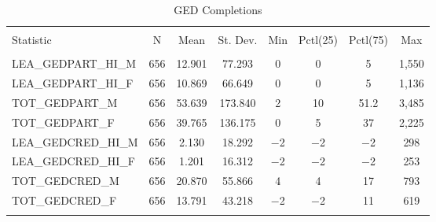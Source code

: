
\begin{table}[!htbp] \centering 
  \caption{GED Completions} 
  \label{} 
\begin{tabular}{@{\extracolsep{5pt}}lccccccc} 
\\[-1.8ex]\hline 
\hline \\[-1.8ex] 
Statistic & \multicolumn{1}{c}{N} & \multicolumn{1}{c}{Mean} & \multicolumn{1}{c}{St. Dev.} & \multicolumn{1}{c}{Min} & \multicolumn{1}{c}{Pctl(25)} & \multicolumn{1}{c}{Pctl(75)} & \multicolumn{1}{c}{Max} \\ 
\hline \\[-1.8ex] 
LEA\_GEDPART\_HI\_M & 656 & 12.901 & 77.293 & 0 & 0 & 5 & 1,550 \\ 
LEA\_GEDPART\_HI\_F & 656 & 10.869 & 66.649 & 0 & 0 & 5 & 1,136 \\ 
TOT\_GEDPART\_M & 656 & 53.639 & 173.840 & 2 & 10 & 51.2 & 3,485 \\ 
TOT\_GEDPART\_F & 656 & 39.765 & 136.175 & 0 & 5 & 37 & 2,225 \\ 
LEA\_GEDCRED\_HI\_M & 656 & 2.130 & 18.292 & $-$2 & $-$2 & $-$2 & 298 \\ 
LEA\_GEDCRED\_HI\_F & 656 & 1.201 & 16.312 & $-$2 & $-$2 & $-$2 & 253 \\ 
TOT\_GEDCRED\_M & 656 & 20.870 & 55.866 & 4 & 4 & 17 & 793 \\ 
TOT\_GEDCRED\_F & 656 & 13.791 & 43.218 & $-$2 & $-$2 & 11 & 619 \\ 
\hline \\[-1.8ex] 
\end{tabular} 
\end{table} 
